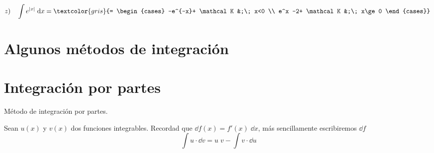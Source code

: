 $z)\quad \displaystyle \int e^{|x|} \;  \dd x =  \textcolor{gris}{= \begin{cases}
	-e^{-x}+ \mathcal K &;\;  x<0 \\
	e^x -2+ \mathcal K &;\;  x\ge 0
	\end{cases}}$ 


\section{Algunos métodos de integración}
\section{Integración por partes}

\begin{teor}{Método de integración por partes}.

Sean $u(x)$ y $v(x)$ dos funciones integrables. Recordad que $\dd f(x) = f'(x)\;  \dd x$, más sencillamente escribiremos $\dd f$
\begin{equation}
\label{partes}
	 \boxed{\; \displaystyle \; \int u\cdot \dd v = u\; v - \displaystyle \int v\cdot \dd u \;} 
\end{equation}
\end{teor}
